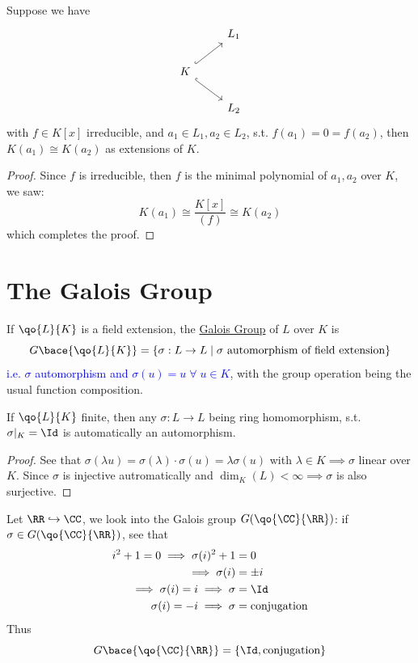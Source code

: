 \begin{eg}
	Suppose we have
	\[
		\begin{tikzcd}
			& L_1 \\
			K \arrow[ru, hook] \arrow[rd, hook] & \\
			& L_2
		\end{tikzcd}
	\]
	with \( f\in K[x] \) irreducible, and \( a_1\in L_1, a_2 \in L_2 \), s.t. \( f(a_1) = 0 = f(a_2) \), then
	\( K(a_1) \cong K(a_2) \) as extensions of \( K \).

	\begin{proof}
		Since \( f \) is irreducible, then \( f \) is the minimal polynomial of \( a_1,a_2 \) over \( K \), we saw:
		\[
			K(a_1) \cong \frac{K[x]}{(f)} \cong K(a_2)
		\]
		which completes the proof.
	\end{proof}
\end{eg}

\section{The Galois Group}

\begin{definition}
	If \( \qo{L}{K} \) is a field extension, the \underline{Galois Group} of \( L \) over \( K \) is
	\[
		G\bace{\qo{L}{K}} = \{\sigma: L \to L \; | \; \sigma \text{ automorphism of field extension}\}
	\]
	\textcolor{blue}{i.e. \( \sigma \) automorphism and \( \sigma(u) = u \; \forall \; u \in K \)}, with the group
	operation being the usual function composition.
\end{definition}

\begin{remark}
	If \( \qo{L}{K} \) finite, then any \( \sigma: L \to L \) being ring homomorphism, s.t. \(
	\sigma|_{K} = \Id \) is automatically an automorphism.
\end{remark}

\begin{proof}
	See that \( \sigma (\lambda u ) = \sigma(\lambda) \cdot \sigma(u) = \lambda \sigma(u) \) with \(
	\lambda \in K \implies \sigma \) linear over \( K \). Since \( \sigma \) is injective
	autromatically and \( \dim_{K}(L) < \infty \implies \sigma \) is also surjective.
\end{proof}

\begin{eg}
	Let \( \RR \hookrightarrow \CC \), we look into the Galois group \( G(\qo{\CC}{\RR}) \): if \(
	\sigma \in G(\qo{\CC}{\RR}) \), see that
	\[
		\begin{aligned}
			i^2 + 1 = 0\implies \sigma(i)^2 + 1    & = 0                  \\
			\implies \sigma(i)                     & = \pm i              \\
			\implies \sigma(i) = i \implies \sigma & = \Id                \\
			\sigma(i) = -i \implies \sigma         & = \text{conjugation}
		\end{aligned}
	\]
	Thus
	\[
		G\bace{\qo{\CC}{\RR}} = \{\Id, \text{conjugation}\}
	\]
\end{eg}

